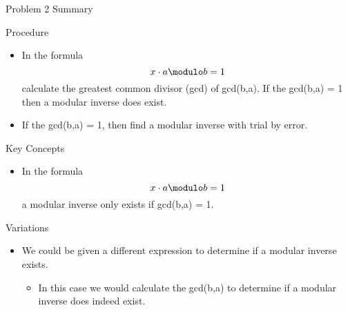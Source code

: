 \begin{summary}{Problem 2 Summary}
    \begin{statement}{Procedure}
        \begin{itemize}
            \item In the formula 
            \begin{equation*}
                x \cdot a \modulo b = 1
            \end{equation*}
            calculate the greatest common divisor (gcd) of gcd(b,a). If the gcd(b,a) = 1 then a modular inverse does exist.
            \item If the gcd(b,a) = 1, then find a modular inverse with trial by error.
        \end{itemize}
    \end{statement}
    \begin{statement}{Key Concepts}
        \begin{itemize}
            \item In the formula
            \begin{equation*}
                x \cdot a \modulo b = 1
            \end{equation*}
            a modular inverse only exists if gcd(b,a) = 1.
        \end{itemize}
    \end{statement}
    \begin{statement}{Variations}
        \begin{itemize}
            \item We could be given a different expression to determine if a modular inverse exists.
            \begin{itemize}
                \item In this case we would calculate the gcd(b,a) to determine if a modular inverse does indeed exist.
            \end{itemize}
        \end{itemize}
    \end{statement}
\end{summary}

